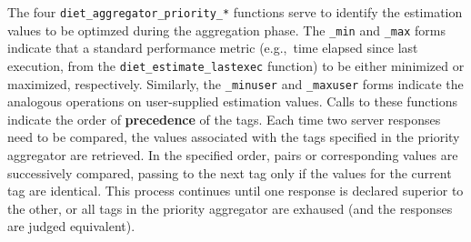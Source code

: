 The four
\texttt{diet\_aggregator\_priority\_*} functions serve to identify the
estimation values to be optimzed during the aggregation phase.  The
\texttt{\_min} and \texttt{\_max} forms indicate that a standard
performance metric (e.g.,~time elapsed since last execution, from the
\texttt{diet\_estimate\_lastexec} function) to be either
minimized or maximized, respectively.  Similarly, the
\texttt{\_minuser} and \texttt{\_maxuser} forms indicate the analogous
operations on user-supplied estimation values.  Calls to these
functions indicate the order of \textbf{precedence} of the tags.  Each
time two server responses need to be compared, the values associated
with the tags specified in the priority aggregator are retrieved.  In
the specified order, pairs or corresponding values are successively
compared, passing to the next tag only if the values for the current
tag are identical.  This process continues until one response is
declared superior to the other, or all tags in the priority aggregator
are exhaused (and the responses are judged equivalent).




